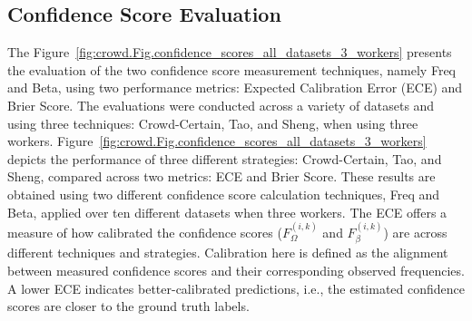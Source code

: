 \documentclass[sn-nature]{bst/sn-jnl}
\begin{document}
\subsection{Confidence Score Evaluation}
The Figure~\ref{fig:crowd.Fig.confidence_scores_all_datasets_3_workers} presents the evaluation of the two confidence score measurement techniques, namely Freq and Beta, using two performance metrics: Expected Calibration Error (ECE) and Brier Score. The evaluations were conducted across a variety of datasets and using three techniques: Crowd-Certain, Tao, and Sheng, when using three workers.
Figure~\ref{fig:crowd.Fig.confidence_scores_all_datasets_3_workers} depicts the performance of three different strategies: Crowd-Certain, Tao, and Sheng, compared across two metrics: ECE and Brier Score. These results are obtained using two different confidence score calculation techniques, Freq and Beta, applied over ten different datasets when three workers. The ECE offers a measure of how calibrated the  confidence scores ($F_{\Omega}^{(i,k)}$ and $F_{\beta}^{(i,k)}$) are across different techniques and strategies. Calibration here is defined as the alignment between measured confidence scores and their corresponding observed frequencies. A lower ECE indicates better-calibrated predictions, i.e., the estimated confidence scores are closer to the ground truth labels.
\end{document}
